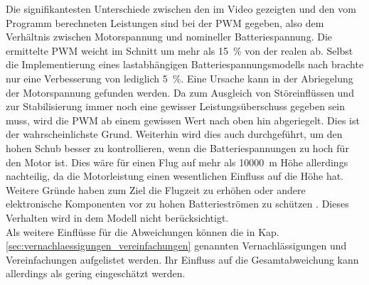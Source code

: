 Die signifikantesten Unterschiede zwischen den im Video gezeigten und den vom Programm berechneten Leistungen sind bei der PWM gegeben, also dem Verhältnis zwischen Motorspannung und nomineller Batteriespannung. Die ermittelte PWM weicht im Schnitt um mehr als \SI{15}{\%} von der realen ab. Selbst die Implementierung eines lastabhängigen Batteriespannungsmodells nach \cite{Tremblay.2009} brachte nur eine Verbesserung von lediglich \SI{5}{\%}. Eine Ursache kann in der Abriegelung der Motorspannung gefunden werden. Da zum Ausgleich von Störeinflüssen und zur Stabilisierung immer noch eine gewisser Leistungsüberschuss gegeben sein muss, wird die PWM ab einem gewissen Wert nach oben hin abgeriegelt. Dies ist der wahrscheinlichste Grund. Weiterhin wird dies auch durchgeführt, um den hohen Schub besser zu kontrollieren, wenn die Batteriespannungen zu hoch für den Motor ist. Dies wäre für einen Flug auf mehr als \SI{10000}{m} Höhe allerdings nachteilig, da die Motorleistung einen wesentlichen Einfluss auf die Höhe hat. Weitere Gründe haben zum Ziel die Flugzeit zu erhöhen oder andere elektronische Komponenten vor zu hohen Batterieströmen zu schützen \cite{arducopter.clav,betaflight,arducopter.mts}.
Dieses Verhalten wird in dem Modell nicht berücksichtigt. \\
Als weitere Einflüsse für die Abweichungen können die in Kap. \ref{sec:vernachlaessigungen_vereinfachungen} genannten Vernachlässigungen und Vereinfachungen aufgelistet werden. Ihr Einfluss auf die Gesamtabweichung kann allerdings als gering eingeschätzt werden.
